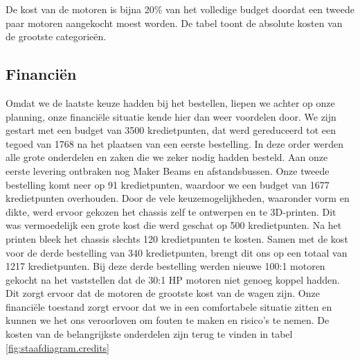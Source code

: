 \documentclass[a4paper,kulak]{kulakarticle}
\begin{document}
\begin{table}[h]
	
	\caption{De kost van de motoren is bijna 20\% van het volledige budget doordat een tweede paar motoren aangekocht moest worden. De tabel toont de absolute kosten van de grootste categorieën.}\label{fig:staafdiagram.credits}
\end{table}
\subsection{Financiën}

Omdat we de laatste keuze hadden bij het bestellen, liepen we achter op onze planning, onze financiële situatie kende hier dan weer voordelen door. We zijn gestart met een budget van 3500 kredietpunten, dat werd gereduceerd tot een tegoed van 1768 na het plaatsen van een eerste bestelling. In deze  order werden alle grote onderdelen en zaken die we zeker nodig hadden besteld.  Aan onze eerste levering ontbraken nog Maker Beams en afstandsbussen. Onze tweede bestelling komt neer op 91 kredietpunten, waardoor we een budget van 1677 kredietpunten overhouden. Door de vele keuzemogelijkheden, waaronder vorm en dikte, werd ervoor gekozen het chassis zelf te ontwerpen en te 3D-printen. Dit was vermoedelijk een grote kost die werd geschat op 500 kredietpunten. Na het printen bleek het chassis slechts 120 kredietpunten te kosten. Samen met de kost voor de derde bestelling van 340 kredietpunten, brengt dit ons op een totaal van 1217 kredietpunten. Bij deze derde bestelling werden nieuwe 100:1 motoren gekocht na het vaststellen dat de 30:1 HP motoren niet genoeg koppel hadden. Dit zorgt ervoor dat de motoren de grootste kost van de wagen zijn. Onze financiële toestand zorgt ervoor dat we in een comfortabele situatie zitten en kunnen we het ons veroorloven om fouten te maken en risico's te nemen. De kosten van de belangrijkste onderdelen zijn terug te vinden in tabel \ref{fig:staafdiagram.credits}
\end{document}
